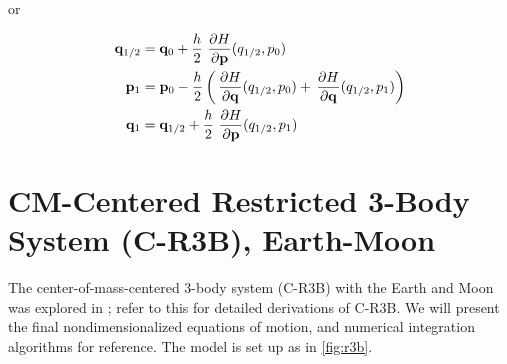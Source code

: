 or

\begin{equation}
    \begin{split} \label{eq:symplectic-verlet2}
        \mathbf{q}_{1/2} &= \mathbf{q}_0 + \frac{h}{2} \operatorname{}\frac{\partial H}{\partial \mathbf{p}}(q_{1/2}, p_0) \\
        \mathbf{p}_1 &= \mathbf{p}_0 - \frac{h}{2} \left( \operatorname{}\frac{\partial H}{\partial \mathbf{q}}(q_{1/2}, p_0) + \operatorname{}\frac{\partial H}{\partial \mathbf{q}}(q_{1/2}, p_1) \right) \\
        \mathbf{q}_{1} &= \mathbf{q}_{1/2} + \frac{h}{2} \operatorname{}\frac{\partial H}{\partial \mathbf{p}}(q_{1/2}, p_1) \\
    \end{split}
\end{equation}



\section{CM-Centered Restricted 3-Body System (C-R3B), Earth-Moon}
The center-of-mass-centered 3-body system (C-R3B) with the Earth and Moon was explored in \cite{Saxe2015}; refer to this for detailed derivations of C-R3B. We will present the final nondimensionalized equations of motion, and numerical integration algorithms for reference. The model is set up as in \cref{fig:r3b}.

